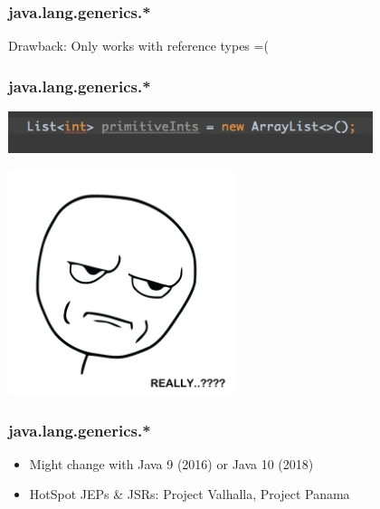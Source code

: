 \begin{frame}
  \frametitle{java.lang.generics.*}
  Drawback: Only works with reference types =(
\end{frame}


\begin{frame}
  \frametitle{java.lang.generics.*}
	\begin{center}
	    \includegraphics[width=0.8\textwidth]{fig/primarray}    
	\end{center}

	\begin{center}
	    \includegraphics[width=0.5\textwidth]{fig/primitives}    
	\end{center}
\end{frame}


\begin{frame}
  \frametitle{java.lang.generics.*}
 \begin{itemize}
    \item Might change with Java 9 (2016) or Java 10 (2018)
    \vspace{0.4cm}
    \item HotSpot JEPs \& JSRs: Project Valhalla, Project Panama
  \end{itemize}  
\end{frame}


